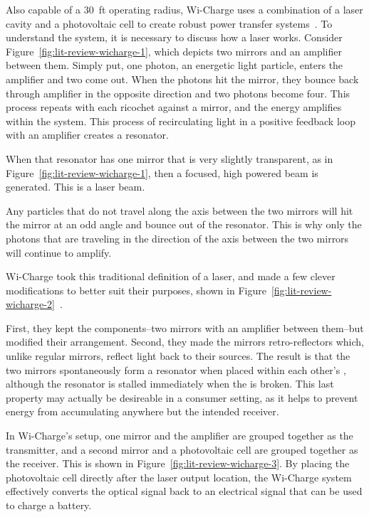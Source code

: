 Also capable of a 30~ft operating radius, Wi-Charge uses a combination of a laser cavity and a photovoltaic cell to create robust power transfer systems~\cite{wicharge2016}. To understand the system, it is necessary to discuss how a laser works. Consider Figure~\ref{fig:lit-review-wicharge-1}, which depicts two mirrors and an amplifier between them. Simply put, one photon, an energetic light particle, enters the amplifier and two come out. When the photons hit the mirror, they bounce back through amplifier in the opposite direction and two photons become four. This process repeats with each ricochet against a mirror, and the energy amplifies within the system. This process of recirculating light in a positive feedback loop with an amplifier creates a resonator.

When that resonator has one mirror that is very slightly transparent, as in Figure~\ref{fig:lit-review-wicharge-1}, then a focused, high powered beam is generated. This is a laser beam.

Any particles that do not travel along the axis between the two mirrors will hit the mirror at an odd angle and bounce out of the resonator. This is why only the photons that are traveling in the direction of the axis between the two mirrors will continue to amplify.

Wi-Charge took this traditional definition of a laser, and made a few clever modifications to better suit their purposes, shown in Figure~\ref{fig:lit-review-wicharge-2}~\cite{wicharge2016}.

First, they kept the components--two mirrors with an amplifier between them--but modified their arrangement. Second, they made the mirrors retro-reflectors which, unlike regular mirrors, reflect light back to their sources. The result is that the two mirrors spontaneously form a resonator when placed within each other's \los, although the resonator is stalled immediately when the \los is broken. This last property may actually be desireable in a consumer setting, as it helps to prevent energy from accumulating anywhere but the intended receiver.

In Wi-Charge's setup, one mirror and the amplifier are grouped together as the transmitter, and a second mirror and a photovoltaic cell are grouped together as the receiver. This is shown in Figure~\ref{fig:lit-review-wicharge-3}. By placing the photovoltaic cell directly after the laser output location, the Wi-Charge system effectively converts the optical signal back to an electrical signal that can be used to charge a battery.

